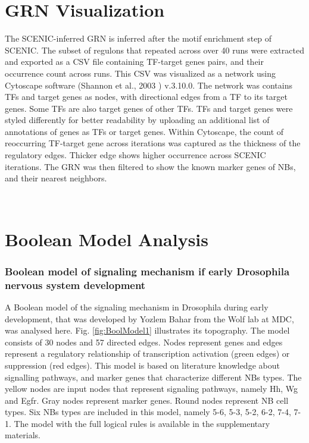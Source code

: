 \section{GRN Visualization}
The SCENIC-inferred GRN is inferred after the motif enrichment step of SCENIC. The subset of regulons that repeated across  
over 40 runs were extracted and exported as a CSV file containing TF-target genes pairs, and their occurrence count across runs. 
This CSV was visualized as a network using Cytoscape software (Shannon et al., 2003 \cite{shannon2003cytoscape}) 
v.3.10.0. The network was contains TFs and target genes as nodes, with directional edges from a TF to its target genes. 
Some TFs are also target genes of other TFs. TFs and target genes were styled differently for better readability by uploading 
an additional list of annotations of genes as TFs or target genes. 
Within Cytoscape, the count of reoccurring TF-target gene across iterations was captured as the thickness of the regulatory edges. 
Thicker edge shows higher occurrence across SCENIC iterations. 
The GRN was then filtered to show the known marker genes of NBs, and their nearest neighbors.

\
\section{Boolean Model Analysis}
\subsubsection{Boolean model of signaling mechanism if early Drosophila nervous system development}
A Boolean model of the signaling mechanism in Drosophila during early development, that was developed by Yozlem Bahar from the 
Wolf lab at MDC, was analysed here. Fig. \ref{fig:BoolModel1} illustrates its topography. The model consists of 30 nodes and 57 
directed edges. Nodes represent genes and edges represent a regulatory relationship of transcription activation (green edges) 
or suppression (red edges). This model is based on literature knowledge about signalling pathways, and marker genes that 
characterize different NBs types. 
The yellow nodes are input nodes that represent signaling pathways, namely Hh, Wg and Egfr. Gray nodes represent marker genes. 
Round nodes represent NB cell types.  Six NBs types are included in this model, namely 5-6, 5-3, 5-2, 6-2, 7-4, 7-1. 
The model with the full logical rules is available in the supplementary materials. 


